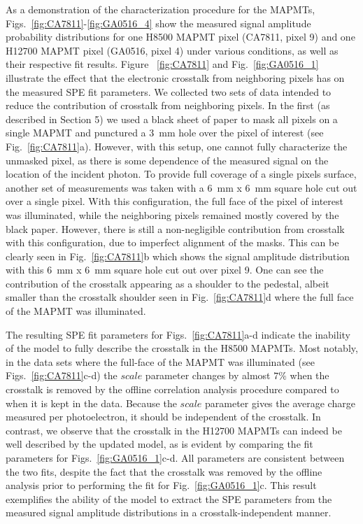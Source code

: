 As a demonstration of the characterization procedure for the MAPMTs, Figs.~\ref{fig:CA7811}-\ref{fig:GA0516_4} show the measured signal amplitude probability distributions for one H8500 MAPMT pixel (CA7811, pixel 9) and one H12700 MAPMT pixel (GA0516, pixel 4) under various conditions, as well as their respective fit results. 
Figure ~\ref{fig:CA7811} and Fig.~\ref{fig:GA0516_1} illustrate the effect that the electronic crosstalk from neighboring pixels has on the measured SPE fit parameters. 
We collected two sets of data intended to reduce the contribution of crosstalk from neighboring pixels. 
In the first (as described in Section 5) we used a black sheet of paper to mask all pixels on a single MAPMT and punctured a 3~mm hole over the pixel of interest (see Fig.~\ref{fig:CA7811}a). 
However, with this setup, one cannot fully characterize the unmasked pixel, as there is some dependence of the measured signal on the location of the incident photon. 
To provide full coverage of a single pixel\textquotesingle s surface, another set of measurements was taken with a 6~mm x 6~mm square hole cut out over a single pixel. 
With this configuration, the full face of the pixel of interest was illuminated, while the neighboring pixels remained mostly covered by the black paper. 
However, there is still a non-negligible contribution from crosstalk with this configuration, due to imperfect alignment of the masks. 
This can be clearly seen in Fig.~\ref{fig:CA7811}b which shows the signal amplitude distribution with this 6~mm x 6~mm square hole cut out over pixel 9. 
One can see the contribution of the crosstalk appearing as a shoulder to the pedestal, albeit smaller than the crosstalk shoulder seen in Fig.~\ref{fig:CA7811}d where the full face of the MAPMT was illuminated. 

The resulting SPE fit parameters for Figs.~\ref{fig:CA7811}a-d indicate the inability of the model to fully describe the crosstalk in the H8500 MAPMTs. 
Most notably, in the data sets where the full-face of the MAPMT was illuminated (see Figs.~\ref{fig:CA7811}c-d) the $scale$ parameter changes by almost $7\%$ when the crosstalk is removed by the offline correlation analysis procedure compared to when it is kept in the data. 
Because the $scale$ parameter gives the average charge measured per photoelectron, it should be independent of the crosstalk. 
In contrast, we observe that the crosstalk in the H12700 MAPMTs can indeed be well described by the updated model, as is evident by comparing the fit parameters for Figs.~\ref{fig:GA0516_1}c-d. 
All parameters are consistent between the two fits, despite the fact that the crosstalk was removed by the offline analysis prior to performing the fit for Fig.~\ref{fig:GA0516_1}c. 
This result exemplifies the ability of the model to extract the SPE parameters from the measured signal amplitude distributions in a crosstalk-independent manner. 

